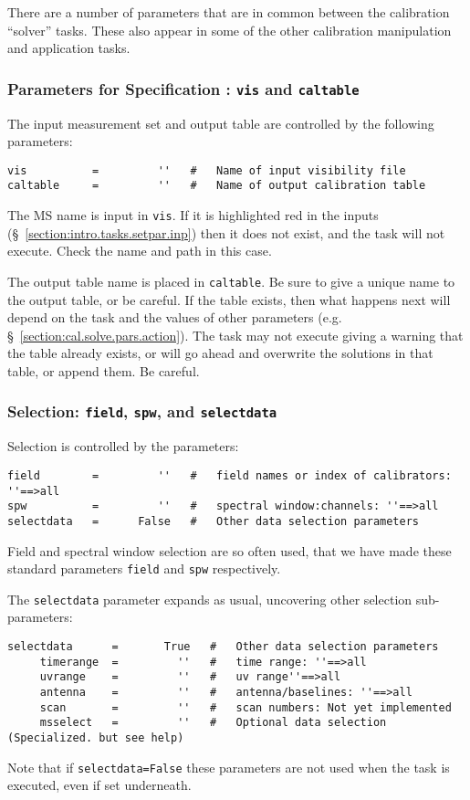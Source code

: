 There are a number of parameters that are in common between 
the calibration ``solver'' tasks.  These also appear in some
of the other calibration manipulation and application tasks.

\subsubsection{Parameters for Specification : {\tt vis} and
{\tt caltable} }
\label{section:cal.solve.pars.spec}

The input measurement set and output table are
controlled by the following parameters:
\small
\begin{verbatim}
vis          =         ''   #   Name of input visibility file
caltable     =         ''   #   Name of output calibration table
\end{verbatim}
\normalsize

The MS name is input in {\tt vis}.  If it is highlighted red
in the inputs (\S~\ref{section:intro.tasks.setpar.inp}) then it 
does not exist, and the task will not execute.  Check the name and
path in this case. 

The output table name is placed in {\tt caltable}.  Be sure to give a
unique name to the output table, or be careful.  If the table exists,
then what happens next will depend on the task and the values of other
parameters (e.g.  \S~\ref{section:cal.solve.pars.action}).  The task
may not execute giving a warning that the table already exists, or
will go ahead and overwrite the solutions in that table, or append
them.  Be careful.

\subsubsection{Selection: {\tt field}, {\tt spw},
and {\tt selectdata} }
\label{section:cal.solve.pars.select}

Selection is controlled by the parameters:
\small
\begin{verbatim}
field        =         ''   #   field names or index of calibrators: ''==>all
spw          =         ''   #   spectral window:channels: ''==>all 
selectdata   =      False   #   Other data selection parameters
\end{verbatim}
\normalsize

Field and spectral window selection are so often used, that we have
made these standard parameters {\tt field} and {\tt spw} respectively.

The {\tt selectdata} parameter expands as usual, uncovering other
selection sub-parameters:
\small
\begin{verbatim}
selectdata      =       True   #   Other data selection parameters
     timerange  =         ''   #   time range: ''==>all 
     uvrange    =         ''   #   uv range''==>all 
     antenna    =         ''   #   antenna/baselines: ''==>all 
     scan       =         ''   #   scan numbers: Not yet implemented
     msselect   =         ''   #   Optional data selection (Specialized. but see help)
\end{verbatim}
\normalsize
Note that if {\tt selectdata=False} these parameters are not used when
the task is executed, even if set underneath.

